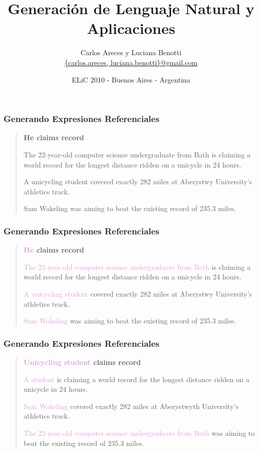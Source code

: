\documentclass[compress,color=usenames]{beamer}
\title[GLN y Aplicaciones]{\Huge Generaci\'on de Lenguaje Natural y Aplicaciones}
\author[Areces \& Benotti]{
 Carlos Areces y Luciana Benotti\\[1ex]
\normalsize \url{{carlos.areces, luciana.benotti}@gmail.com}}
\institute[INRIA / UNC]{
INRIA Nancy Grand Est, Nancy, France\\
Universidad Nacional de C\'ordoba, C\'ordoba, Argentina}
\date{ELiC 2010 - Buenos Aires - Argentina}
\newcommand{\mH}[1]{\textcolor{Plum}{#1}}
\begin{document}
\beamerdefaultoverlayspecification{}

\begin{frame}[plain]
 \titlepage
\end{frame}

\begin{frame}
\frametitle{Generando Expresiones Referenciales}

\begin{quote}

\textbf{He claims record}\medskip

The 22-year-old computer science undergraduate from Bath is
claiming a world record for the longest distance ridden on a
unicycle in 24 hours.\medskip

A unicycling student covered exactly 282 miles at Aberystwy
University's athletics track.\medskip

Sam Wakeling was aiming to beat the existing record of 235.3
miles.
\end{quote}

\end{frame}

\begin{frame}
\frametitle{Generando Expresiones Referenciales}

\begin{quote}

\textbf{\mH{He} claims record}\medskip

\mH{The 22-year-old computer science undergraduate from Bath} is
claiming a world record for the longest distance ridden on a
unicycle in 24 hours.\medskip

\mH{A unicycling student} covered exactly 282 miles at Aberystwy
University's athletics track.\medskip

\mH{Sam Wakeling} was aiming to beat the existing record of 235.3
miles.
\end{quote}

\end{frame}

\begin{frame}
\frametitle{Generando Expresiones Referenciales}

\begin{quote}
\textbf{\mH{Unicycling student} claims record}\medskip

\mH{A student} is claiming a world record for the longest distance ridden
on a unicycle in 24 hours.\medskip

\mH{Sam Wakeling} covered exactly 282 miles at Aberystwyth
University's athletics track.\medskip

\mH{The 22-year-old computer science undergraduate from Bath} was
aiming to beat the existing record of 235.3 miles.
\end{quote}

\end{frame}
\end{document}
